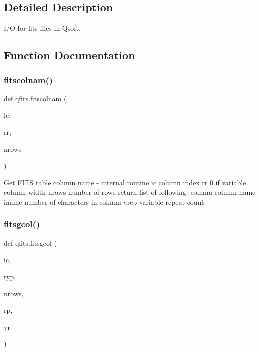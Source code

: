 \subsection{Detailed Description}
I/O for fits files in Qsoft. 

\subsection{Function Documentation}
\mbox{\label{namespaceqfits_a5f967db5997b8ec294baffb292116d36}} 
\subsubsection{\texorpdfstring{fitscolnam()}{fitscolnam()}}
{\footnotesize\ttfamily def qfits.\+fitscolnam (\begin{DoxyParamCaption}\item[{}]{ic,  }\item[{}]{rr,  }\item[{}]{nrows }\end{DoxyParamCaption})}

\begin{DoxyVerb}Get FITS table column name - internal routine
    ic      column index
    rr      0 if variable column width
    nrows   number of rows
return list of following:
    colnam    column name
    iname     number of characters in colnam
    vrep      variable repeat count
\end{DoxyVerb}
 \mbox{\label{namespaceqfits_a2468c5a46640e7a5405bc1b66c75a99e}} 
\subsubsection{\texorpdfstring{fitsgcol()}{fitsgcol()}}
{\footnotesize\ttfamily def qfits.\+fitsgcol (\begin{DoxyParamCaption}\item[{}]{ic,  }\item[{}]{typ,  }\item[{}]{nrows,  }\item[{}]{rp,  }\item[{}]{vr }\end{DoxyParamCaption})}

